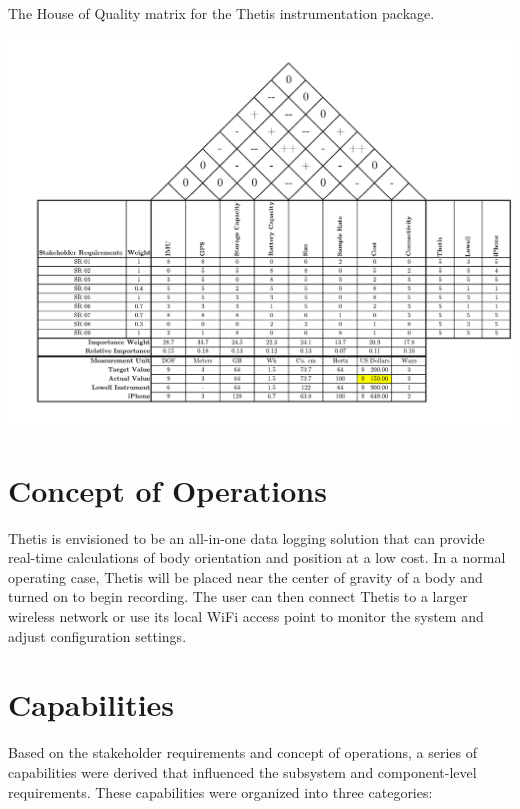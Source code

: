 \begin{landscape}
	\begin{table}
		\caption[House of Quality]{The House of Quality matrix for the Thetis instrumentation package.}
		\label{tab:hoq}
		\centering
		\includegraphics[height=\textwidth-24pt]{../include/ThetisHOQ.pdf}
	\end{table}
\end{landscape}

\section{Concept of Operations} 
Thetis is envisioned to be an all-in-one data logging solution that can provide real-time calculations of body orientation and position at a low cost.
In a normal operating case, Thetis will be placed near the center of gravity of a body and turned on to begin recording.
The user can then connect Thetis to a larger wireless network or use its local WiFi access point to monitor the system and adjust configuration settings.

\section{Capabilities} 
Based on the stakeholder requirements and concept of operations, a series of capabilities were derived that influenced the subsystem and component-level requirements.
These capabilities were organized into three categories:

